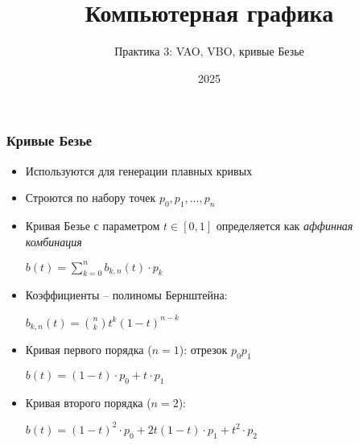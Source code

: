 \documentclass[10pt]{beamer}
\title{Компьютерная графика}
\subtitle{Практика 3: VAO, VBO, кривые Безье}
\date{2025}
\begin{document}
\frame{\titlepage}

\begin{frame}[fragile]
\frametitle{Кривые Безье}
\begin{itemize}
\item Используются для генерации плавных кривых
\pause
\item Строются по набору точек \begin{math}p_0, p_1, \dots, p_n\end{math}
\pause
\item Кривая Безье с параметром \begin{math}t \in [0, 1]\end{math} определяется как \textit{аффинная комбинация}

\begin{center}
\begin{math}
b(t) = \sum\limits_{k=0}^n b_{k,n}(t) \cdot p_k
\end{math}
\end{center}

\pause
\item Коэффициенты -- полиномы Бернштейна:

\begin{center}
\begin{math}
b_{k,n}(t) = \binom{n}{k}t^k(1-t)^{n-k}
\end{math}
\end{center}

\pause
\item Кривая первого порядка (\begin{math}n=1\end{math}): отрезок \begin{math}p_0 p_1\end{math}

\begin{center}
\begin{math}
b(t) = (1-t)\cdot p_0 + t \cdot p_1
\end{math}
\end{center}

\pause
\item Кривая второго порядка (\begin{math}n=2\end{math}):

\begin{center}
\begin{math}
b(t) = (1-t)^2 \cdot p_0 + 2t(1-t) \cdot p_1 + t^2 \cdot p_2
\end{math}
\end{center}

\end{itemize}
\end{frame}
\end{document}
